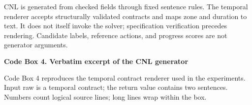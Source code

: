 \documentclass[nolineno]{ieeeaccess}
\begin{document}
CNL is generated from checked fields through fixed sentence rules. The temporal renderer accepts structurally validated contracts and maps zone and duration to text. It does not itself invoke the solver; specification verification precedes rendering. Candidate labels, reference actions, and progress scores are not generator arguments.\par

\textbf{Code Box 4. Verbatim excerpt of the CNL generator}\par

Code Box 4 reproduces the temporal contract renderer used in the experiments. Input raw is a temporal contract; the return value contains two sentences. Numbers count logical source lines; long lines wrap within the box.\par

\par\smallskip\noindent{}\par\smallskip
\end{document}
